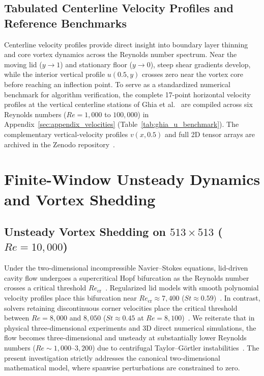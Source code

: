 \documentclass[11pt,a4paper]{article}
\begin{document}
\subsection{Tabulated Centerline Velocity Profiles and Reference Benchmarks}
\label{sec:centerline_profiles}
Centerline velocity profiles provide direct insight into boundary layer thinning and core vortex dynamics across the Reynolds number spectrum. Near the moving lid ($y \to 1$) and stationary floor ($y \to 0$), steep shear gradients develop, while the interior vertical profile $u(0.5, y)$ crosses zero near the vortex core before reaching an inflection point. To serve as a standardized numerical benchmark for algorithm verification, the complete 17-point horizontal velocity profiles at the vertical centerline stations of Ghia et al.~\cite{ghia1982high} are compiled across six Reynolds numbers ($Re = 1{,}000$ to $100{,}000$) in Appendix~\ref{sec:appendix_velocities} (Table~\ref{tab:ghia_u_benchmark}). The complementary vertical-velocity profiles $v(x, 0.5)$ and full 2D tensor arrays are archived in the Zenodo repository~\cite{gangwar2026solver}.

\section{Finite-Window Unsteady Dynamics and Vortex Shedding}

\subsection{Unsteady Vortex Shedding on \texorpdfstring{$513 \times 513$}{513x513} (\texorpdfstring{$Re = 10,000$}{Re = 10000})}
Under the two-dimensional incompressible Navier--Stokes equations, lid-driven cavity flow undergoes a supercritical Hopf bifurcation as the Reynolds number crosses a critical threshold $Re_{\text{cr}}$~\cite{shen1991hopf,peng2003transition,bruneau20062d,auteri2002numerical}. Regularized lid models with smooth polynomial velocity profiles place this bifurcation near $Re_{\text{cr}} \approx 7{,}400$ ($St \approx 0.59$)~\cite{peng2003transition,shen1991hopf}. In contrast, solvers retaining discontinuous corner velocities place the critical threshold between $Re = 8{,}000$ and $8{,}050$ ($St \approx 0.45$ at $Re = 8{,}100$)~\cite{bruneau20062d,auteri2002numerical}. We reiterate that in physical three-dimensional experiments and 3D direct numerical simulations, the flow becomes three-dimensional and unsteady at substantially lower Reynolds numbers ($Re \sim 1{,}000\text{--}3{,}200$) due to centrifugal Taylor--G\"ortler instabilities~\cite{koseff1984hydrothermal,aidun1991primary,albensoeder2001three}. The present investigation strictly addresses the canonical two-dimensional mathematical model, where spanwise perturbations are constrained to zero.
\end{document}
